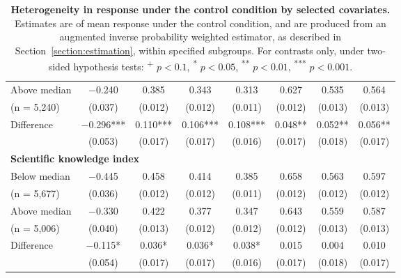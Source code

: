 \begin{table}[H]
{\begin{tabular}{lccccccc}
\hspace{1em} Above median  & \num{-0.240} & \num{0.385} & \num{0.343} & \num{0.313} & \num{0.627} & \num{0.535} & \num{0.564}\\
\hspace{1.5em}  (n = 5,240) & (\num{0.037}) & (\num{0.012}) & (\num{0.012}) & (\num{0.011}) & (\num{0.012}) & (\num{0.013}) & (\num{0.013})\\
\cmidrule(lr){2-8}
\hspace{1em} Difference & \num{-0.296}*** & \num{0.110}*** & \num{0.106}*** & \num{0.108}*** & \num{0.048}** & \num{0.052}** & \num{0.056}**\\
 & (\num{0.053}) & (\num{0.017}) & (\num{0.017}) & (\num{0.016}) & (\num{0.017}) & (\num{0.018}) & (\num{0.017})\\
\multicolumn{4}{l}{\textbf{Scientific knowledge index}} \rule{0pt}{1.2\normalbaselineskip} \\
\hspace{1em} Below median & \num{-0.445} & \num{0.458} & \num{0.414} & \num{0.385} & \num{0.658} & \num{0.563} & \num{0.597}\\
\hspace{1.5em}   (n = 5,677) & (\num{0.036}) & (\num{0.012}) & (\num{0.012}) & (\num{0.011}) & (\num{0.012}) & (\num{0.012}) & (\num{0.012})\\
\hspace{1em} Above median & \num{-0.330} & \num{0.422} & \num{0.377} & \num{0.347} & \num{0.643} & \num{0.559} & \num{0.587}\\
\hspace{1.5em}  (n = 5,006)  & (\num{0.040}) & (\num{0.013}) & (\num{0.012}) & (\num{0.012}) & (\num{0.012}) & (\num{0.013}) & (\num{0.013})\\
\cmidrule(lr){2-8}
\hspace{1em} Difference  & \num{-0.115}* & \num{0.036}* & \num{0.036}* & \num{0.038}* & \num{0.015} & \num{0.004} & \num{0.010}\\
 & (\num{0.054}) & (\num{0.017}) & (\num{0.017}) & (\num{0.016}) & (\num{0.017}) & (\num{0.018}) & (\num{0.017})\\
   \end{tabular}}
   \caption{\textbf{Heterogeneity in response under the control condition by selected covariates.} Estimates are of mean response under the control condition, and are produced from an augmented inverse probability weighted estimator, as described in Section~\ref{section:estimation}, within specified subgroups. For contrasts only, under two-sided hypothesis tests: \textsuperscript{+} $p<0.1$, \textsuperscript{*} $p < 0.05$, \textsuperscript{**} $p < 0.01$, \textsuperscript{***} $p < 0.001$.}
\label{tab:heterogeneity_control}
\end{table}
